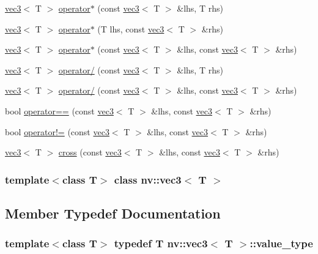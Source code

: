 \begin{CompactItemize}
\hyperlink{classnv_1_1vec3}{vec3}$<$ T $>$ \hyperlink{classnv_1_1vec3_1a68fca99ee9a6ba467baf36d9b477dd}{operator$\ast$} (const \hyperlink{classnv_1_1vec3}{vec3}$<$ T $>$ \&lhs, T rhs)
\item 
\hyperlink{classnv_1_1vec3}{vec3}$<$ T $>$ \hyperlink{classnv_1_1vec3_1abb03b326653c94eedbff6b967a0fa8}{operator$\ast$} (T lhs, const \hyperlink{classnv_1_1vec3}{vec3}$<$ T $>$ \&rhs)
\item 
\hyperlink{classnv_1_1vec3}{vec3}$<$ T $>$ \hyperlink{classnv_1_1vec3_b0365df5a4a15bca5aa86f13f0642d33}{operator$\ast$} (const \hyperlink{classnv_1_1vec3}{vec3}$<$ T $>$ \&lhs, const \hyperlink{classnv_1_1vec3}{vec3}$<$ T $>$ \&rhs)
\item 
\hyperlink{classnv_1_1vec3}{vec3}$<$ T $>$ \hyperlink{classnv_1_1vec3_7871a19554011d56a1e97822e1eaf340}{operator/} (const \hyperlink{classnv_1_1vec3}{vec3}$<$ T $>$ \&lhs, T rhs)
\item 
\hyperlink{classnv_1_1vec3}{vec3}$<$ T $>$ \hyperlink{classnv_1_1vec3_81ffa1ef5723fd3e1592fe13eaa79728}{operator/} (const \hyperlink{classnv_1_1vec3}{vec3}$<$ T $>$ \&lhs, const \hyperlink{classnv_1_1vec3}{vec3}$<$ T $>$ \&rhs)
\item 
bool \hyperlink{classnv_1_1vec3_0cada26488c14237f5e3cad4bcf16ab9}{operator==} (const \hyperlink{classnv_1_1vec3}{vec3}$<$ T $>$ \&lhs, const \hyperlink{classnv_1_1vec3}{vec3}$<$ T $>$ \&rhs)
\item 
bool \hyperlink{classnv_1_1vec3_cd3e3772974abccec731c328931e1aa7}{operator!=} (const \hyperlink{classnv_1_1vec3}{vec3}$<$ T $>$ \&lhs, const \hyperlink{classnv_1_1vec3}{vec3}$<$ T $>$ \&rhs)
\item 
\hyperlink{classnv_1_1vec3}{vec3}$<$ T $>$ \hyperlink{classnv_1_1vec3_82d0fe479389dc0f4c0e51f504427f56}{cross} (const \hyperlink{classnv_1_1vec3}{vec3}$<$ T $>$ \&lhs, const \hyperlink{classnv_1_1vec3}{vec3}$<$ T $>$ \&rhs)
\end{CompactItemize}
\subsubsection*{template$<$class T$>$ class nv::vec3$<$ T $>$}



\subsection{Member Typedef Documentation}
\hypertarget{classnv_1_1vec3_c9b2ba01240d87192bbdd37f52979cb7}{
\subsubsection[{value\_\-type}]{\setlength{\rightskip}{0pt plus 5cm}template$<$class T$>$ typedef T {\bf nv::vec3}$<$ T $>$::{\bf value\_\-type}}}
\label{classnv_1_1vec3_c9b2ba01240d87192bbdd37f52979cb7}




